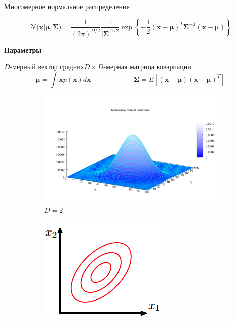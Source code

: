 \documentclass[aspectratio=169]{beamer}
\begin{document}
\begin{frame}{Многомерное нормальное распределение}

\[
\mathcal{N(\mathbf{x} | \mathbf{\mu}, \mathbf{\Sigma}}) = \frac{1}{(2 \pi)^{D/2}} \frac{1}{|\mathbf{\Sigma}|^{1/2}} \exp \left\{-\frac{1}{2}(\mathbf{x} - \mathbf{\mu})^T \mathbf{\Sigma^{-1}} (\mathbf{x} - \mathbf{\mu})\right\}
\]

\vspace{0.7em}
\begin{center}
{\bf Параметры}
\end{center}
\quad${D}$-мерный вектор средних\qquad$D \times D$-мерная матрица ковариации 
\[
\mathbf{\mu} = \int \mathbf{x} p({\mathbf{x}}) d\mathbf{x}
\qquad\qquad\qquad
\mathbf{\Sigma} = E[(\mathbf{x} - \mathbf{\mu})(\mathbf{x} - \mathbf{\mu})^T]
\]
\begin{figure}
        \centering
        \begin{subfigure}[b]{0.23\textwidth}
                \includegraphics[width=\textwidth]{images/multi.png}
                \caption{$D = 2$}                
        \end{subfigure}    
        \begin{subfigure}[b]{0.23\textwidth}
                \includegraphics[width=\textwidth]{images/gnormal.png}

\end{subfigure}
\end{figure}
\end{frame}
\end{document}
